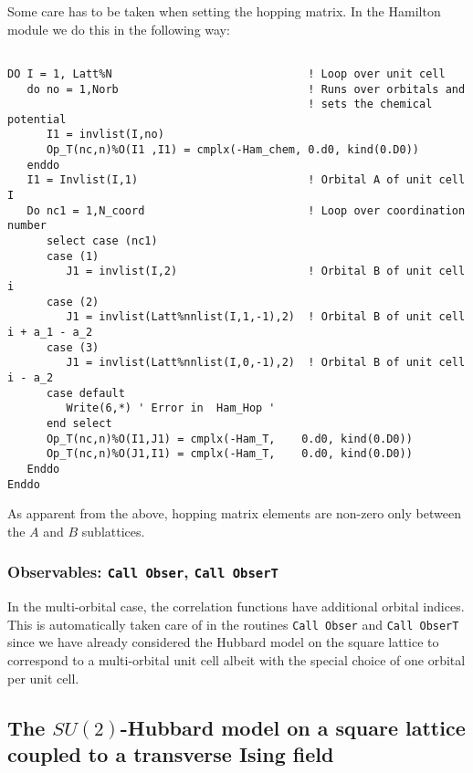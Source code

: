 Some care has to be taken when setting the hopping matrix. In the Hamilton module  we do this in the following way:

\begin{lstlisting}

DO I = 1, Latt%N                              ! Loop over unit cell 
   do no = 1,Norb                             ! Runs over orbitals and 
                                              ! sets the chemical potential
      I1 = invlist(I,no)  
      Op_T(nc,n)%O(I1 ,I1) = cmplx(-Ham_chem, 0.d0, kind(0.D0))
   enddo
   I1 = Invlist(I,1)                          ! Orbital A of unit cell I
   Do nc1 = 1,N_coord                         ! Loop over coordination  number
      select case (nc1)
      case (1)
         J1 = invlist(I,2)                    ! Orbital B of unit cell i
      case (2)
         J1 = invlist(Latt%nnlist(I,1,-1),2)  ! Orbital B of unit cell i + a_1 - a_2
      case (3)
         J1 = invlist(Latt%nnlist(I,0,-1),2)  ! Orbital B of unit cell i - a_2 
      case default
         Write(6,*) ' Error in  Ham_Hop '  
      end select
      Op_T(nc,n)%O(I1,J1) = cmplx(-Ham_T,    0.d0, kind(0.D0))   
      Op_T(nc,n)%O(J1,I1) = cmplx(-Ham_T,    0.d0, kind(0.D0))
   Enddo
Enddo

\end{lstlisting}
As apparent from the above, hopping matrix elements   are non-zero only between the $A$ and $B$  sublattices. 

\subsubsection{Observables:  \texttt{Call Obser},   \texttt{Call ObserT}}

In the multi-orbital case,  the correlation functions have additional orbital indices. This is automatically taken care of in the routines \texttt{Call Obser} and \texttt{Call ObserT}  since  we have already considered the  Hubbard model on the square lattice to correspond to a multi-orbital unit cell albeit with the special choice of one orbital per unit cell. 

\subsection{The $SU(2)$-Hubbard model on a square lattice coupled to a transverse Ising field}\label{sec:walk2}


